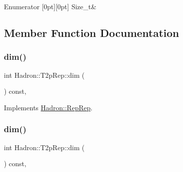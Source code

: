 \begin{DoxyEnumFields}{Enumerator}
[0pt][0pt]{}\mbox{\label{structHadron_1_1T2pRep_a2df836cd2e8ad1f9c1facd0d3ae1d332aa4ac0c05edb5f11de85bd33c675ea98c}} 
Size\+\_\+t&\\
\hline

\end{DoxyEnumFields}


\subsection{Member Function Documentation}
\mbox{\label{structHadron_1_1T2pRep_a7ececbae074c65b493f3bf73cf32c393}} 
\subsubsection{\texorpdfstring{dim()}{dim()}\hspace{0.1cm}{\footnotesize\ttfamily [1/3]}}
{\footnotesize\ttfamily int Hadron\+::\+T2p\+Rep\+::dim (\begin{DoxyParamCaption}{ }\end{DoxyParamCaption}) const\hspace{0.3cm}{\ttfamily [inline]}, {\ttfamily [virtual]}}



Implements \mbox{\hyperlink{structHadron_1_1RepRep_a92c8802e5ed7afd7da43ccfd5b7cd92b}{Hadron\+::\+Rep\+Rep}}.

\mbox{\label{structHadron_1_1T2pRep_a7ececbae074c65b493f3bf73cf32c393}} 
\subsubsection{\texorpdfstring{dim()}{dim()}\hspace{0.1cm}{\footnotesize\ttfamily [2/3]}}
{\footnotesize\ttfamily int Hadron\+::\+T2p\+Rep\+::dim (\begin{DoxyParamCaption}{ }\end{DoxyParamCaption}) const\hspace{0.3cm}{\ttfamily [inline]}, {\ttfamily [virtual]}}



